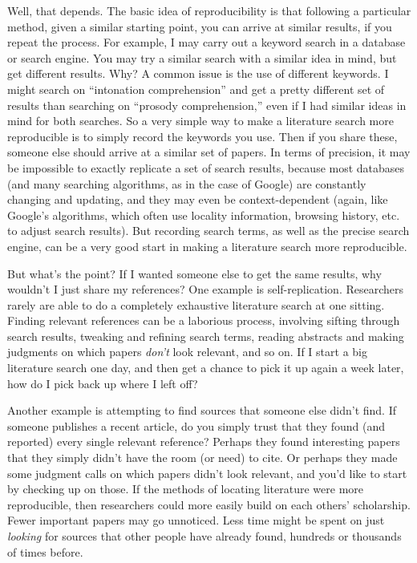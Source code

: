 \documentclass{book}
\begin{document}
Well, that depends. The basic idea of reproducibility is that following a particular method, given a similar starting point, you can arrive at similar results, if you repeat the process.  For example, I may carry out a keyword search in a database or search engine.  You may try a similar search with a similar idea in mind, but get different results. Why?  A common issue is the use of different keywords.  I might search on ``intonation comprehension'' and get a pretty different set of results than searching on ``prosody comprehension,'' even if I had similar ideas in mind for both searches. So a very simple way to make a literature search more reproducible is to simply record the keywords you use.  Then if you share these, someone else should arrive at a similar set of papers.  In terms of precision, it may be impossible to exactly replicate a set of search results, because most databases (and many searching algorithms, as in the case of Google) are constantly changing and updating, and they may even be context-dependent (again, like Google's algorithms, which often use locality information, browsing history, etc. to adjust search results).  But recording search terms, as well as the precise search engine, can be a very good start in making a literature search more reproducible.

But what's the point?  If I wanted someone else to get the same results, why wouldn't I just share my references?  One example is self-replication. Researchers rarely are able to do a completely exhaustive literature search at one sitting.  Finding relevant references can be a laborious process, involving sifting through search results, tweaking and refining search terms, reading abstracts and making judgments on which papers \emph{don't} look relevant, and so on.  If I start a big literature search one day, and then get a chance to pick it up again a week later, how do I pick back up where I left off?  

Another example is attempting to find sources that someone else didn't find.  If someone publishes a recent article, do you simply trust that they found (and reported) every single relevant reference?  Perhaps they found interesting papers that they simply didn't have the room (or need) to cite.  Or perhaps they made some judgment calls on which papers didn't look relevant, and you'd like to start by checking up on those.  If the methods of locating literature were more reproducible, then researchers could more easily build on each others' scholarship. Fewer important papers may go unnoticed. Less time might be spent on just \emph{looking} for sources that other people have already found, hundreds or thousands of times before.
\end{document}
